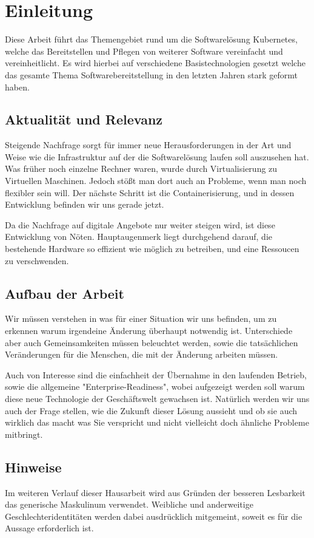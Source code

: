 \section{Einleitung}
Diese Arbeit führt das Themengebiet rund um die Softwarelösung Kubernetes, welche das Bereitstellen und Pflegen von weiterer Software vereinfacht und vereinheitlicht. 
Es wird hierbei auf verschiedene Basistechnologien gesetzt welche das gesamte Thema Softwarebereitstellung in den letzten Jahren stark geformt haben.

\subsection{Aktualität und Relevanz}
Steigende Nachfrage sorgt für immer neue Herausforderungen in der Art und Weise wie die Infrastruktur auf der die Softwarelösung laufen soll auszusehen hat. Was früher noch einzelne Rechner waren, wurde durch Virtualisierung zu Virtuellen Maschinen.
Jedoch stößt man dort auch an Probleme, wenn man noch flexibler sein will. Der nächste Schritt ist die Containerisierung, und in dessen Entwicklung befinden wir uns gerade jetzt.

Da die Nachfrage auf digitale Angebote nur weiter steigen wird, ist diese Entwicklung von Nöten. Hauptaugenmerk liegt durchgehend darauf, die bestehende Hardware so effizient wie möglich zu betreiben, und eine Ressoucen zu verschwenden.

\subsection{Aufbau der Arbeit}
Wir müssen verstehen in was für einer Situation wir uns befinden, um zu erkennen warum irgendeine Änderung überhaupt notwendig ist. Unterschiede aber auch Gemeinsamkeiten müssen beleuchtet werden, sowie die tatsächlichen Veränderungen 
für die Menschen, die mit der Änderung arbeiten müssen.

Auch von Interesse sind die einfachheit der Übernahme in den laufenden Betrieb, sowie die allgemeine "Enterprise-Readiness", wobei aufgezeigt werden soll warum diese neue Technologie der Geschäftswelt gewachsen ist.
Natürlich werden wir uns auch der Frage stellen, wie die Zukunft dieser Lösung aussieht und ob sie auch wirklich das macht was Sie verspricht und nicht vielleicht doch ähnliche Probleme mitbringt.

\subsection{Hinweise}
Im weiteren Verlauf dieser Hausarbeit wird aus Gründen der besseren Lesbarkeit das generische Maskulinum verwendet. Weibliche und anderweitige Geschlechteridentitäten werden dabei ausdrücklich mitgemeint, soweit es für die Aussage erforderlich ist.

